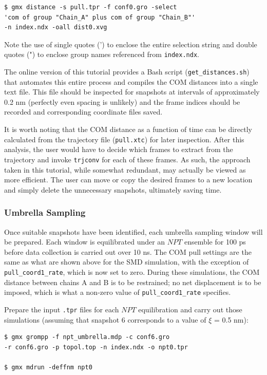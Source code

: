 \documentclass[9pt,tutorial]{livecoms}
\begin{document}
\begin{verbatim}
$ gmx distance -s pull.tpr -f conf0.gro -select
'com of group "Chain_A" plus com of group "Chain_B"'
-n index.ndx -oall dist0.xvg
\end{verbatim}

Note the use of single quotes (') to enclose the entire selection string and double quotes (") to enclose group names referenced from \texttt{index.ndx}.

The online version of this tutorial provides a Bash script (\texttt{get\_distances.sh}) that automates this entire process and compiles the COM distances into a single text file. This file should be inspected for snapshots at intervals of approximately 0.2 nm (perfectly even spacing is unlikely) and the frame indices should be recorded and corresponding coordinate files saved.

It is worth noting that the COM distance as a function of time can be directly calculated from the trajectory file (\texttt{pull.xtc}) for later inspection. After this analysis, the user would have to decide which frames to extract from the trajectory and invoke \texttt{trjconv} for each of these frames. As such, the approach taken in this tutorial, while somewhat redundant, may actually be viewed as more efficient. The user can move or copy the desired frames to a new location and simply delete the unnecessary snapshots, ultimately saving time.

\subsubsection{Umbrella Sampling} \label{umbrella_us}

Once suitable snapshots have been identified, each umbrella sampling window will be prepared. Each window is equilibrated under an $NPT$ ensemble for 100 ps before data collection is carried out over 10 ns. The COM pull settings are the same as what are shown above for the SMD simulation, with the exception of \texttt{pull\_coord1\_rate}, which is now set to zero. During these simulations, the COM distance between chains A and B is to be restrained; no net displacement is to be imposed, which is what a non-zero value of \texttt{pull\_coord1\_rate} specifies.

Prepare the input \texttt{.tpr} files for each $NPT$ equilibration and carry out those simulations (assuming that snapshot 6 corresponds to a value of $\xi$ = 0.5 nm):

\begin{verbatim}
$ gmx grompp -f npt_umbrella.mdp -c conf6.gro 
-r conf6.gro -p topol.top -n index.ndx -o npt0.tpr

$ gmx mdrun -deffnm npt0
\end{verbatim}
\end{document}
